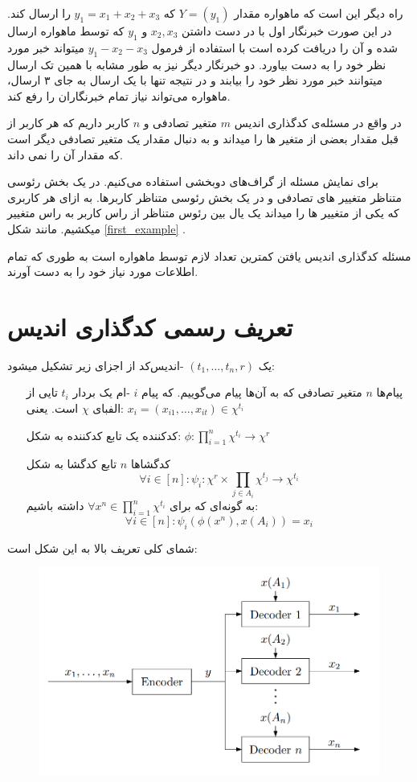 راه دیگر این است که ماهواره مقدار
$Y = (y_1)$
که
$y_1 = x_1 + x_2 + x_3$
را ارسال کند. در این صورت خبرنگار اول با در دست داشتن
$x_2, x_3$
و 
$y_1$
که توسط ماهواره ارسال شده و آن را دریافت کرده است با استفاده از فرمول
$y_1 - x_2 - x_3$
میتواند خبر مورد نظر خود را به دست بیاورد. دو خبرنگار دیگر نیز به طور مشابه با همین تک ارسال میتوانند خبر مورد نظر خود را بیابند و در نتیجه تنها با یک ارسال به جای ۳ ارسال، ماهواره می‌تواند نیاز تمام خبرنگاران را رفع کند.

در واقع در مسئله‌ی کدگذاری اندیس
$m$
متغیر تصادفی و
$n$
کاربر داریم که هر کاربر از قبل مقدار بعضی از متغیر ها را میداند و به دنبال مقدار یک متغیر تصادفی دیگر است که مقدار آن را نمی داند.

برای نمایش مسئله از گراف‌های دوبخشی استفاده می‌کنیم. در یک بخش رئوسی متناظر متغییر های تصادفی و در یک بخش رئوسی متناظر کاربرها. به ازای هر کاربری که یکی از متغییر ها را میداند یک یال بین رئوس متناظر از راس کاربر به راس متغییر میکشیم. مانند شکل
\ref{first_example}
.

مسئله کدگذاری اندیس یافتن کمترین تعداد
لازم توسط ماهواره است به طوری که تمام 
اطلاعات مورد نیاز خود را به دست آورند.
\section{تعریف رسمی کدگذاری اندیس}

\begin{definition}
	یک
	$(t_1, \ldots, t_n, r)$
	-اندیس‌کد از اجزای زیر تشکیل میشود:
	\begin{itemize}
		\item [پیام‌ها]
		$n$
		 متغیر تصادفی که به آن‌ها پیام می‌گوییم. که پیام
		  $i$
		  -ام یک بردار 
		  $t_i$
		  تایی از الفبای
		  $\chi$
		  است. یعنی:
		  $x_i = (x_{i1}, \ldots, x_{it}) \in \chi^{t_i}$
		  \item[
		  کدکننده
		  ]
		   یک تابع کدکننده به شکل:
		   $\phi: \prod\limits_{i = 1}^n \chi^{t_i}  \rightarrow \chi^r$
		  \item[
		  کدگشاها
		  ]
		  $n$
		  تابع کدگشا به شکل
		  $$\forall i \in [n]: \psi_i: \chi^r \times  \prod\limits_{j \in A_i} \chi^{t_j} \rightarrow \chi^{t_i}$$
		  به گونه‌ای که برای
		  $\forall x^n \in \prod\limits_{i = 1}^{n} \chi^{t_i}$
		  داشته باشیم:
		  $$\forall i \in [n]: \psi_i(\phi(x^n), x(A_i)) = x_i$$
	\end{itemize}
\end{definition}
شمای کلی تعریف بالا به این شکل است:
\begin{figure}[H]
	\centering
	\includegraphics[width=0.7\linewidth]{figs/chapter1/fatemeh2}
	\caption{}
	\label{fig:fatemeh2}
\end{figure}

